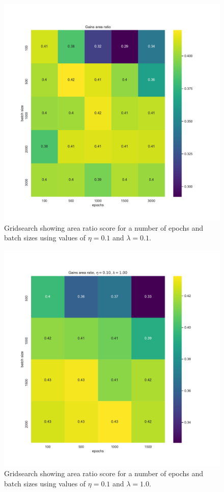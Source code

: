 \documentclass[%
oneside,                 %
final,                   %
10pt]{article}
\begin{document}
\begin{figure}[!h]
        \centering 
         \includegraphics[scale=0.5]{../Results/CC_NN_gridsearch/gridsearch_NN_area_epocs.pdf} 
        \caption{Gridsearch showing area ratio score for a number of epochs and batch sizes using  values of $\eta=0.1$ and $\lambda=0.1$.}
        \label{fig:NN1_grid_epoch}   
\end{figure}  

\begin{figure}[!h]
        \centering 
         \includegraphics[scale=0.5]{../Results/CC_NN_gridsearch/gridsearch_NN_area_highlambda.pdf} 
        \caption{Gridsearch showing area ratio score for a number of epochs and batch sizes using  values of $\eta=0.1$ and $\lambda=1.0$.}
        \label{fig:NN1_grid_epoch_highl}   
\end{figure}  
\end{document}
